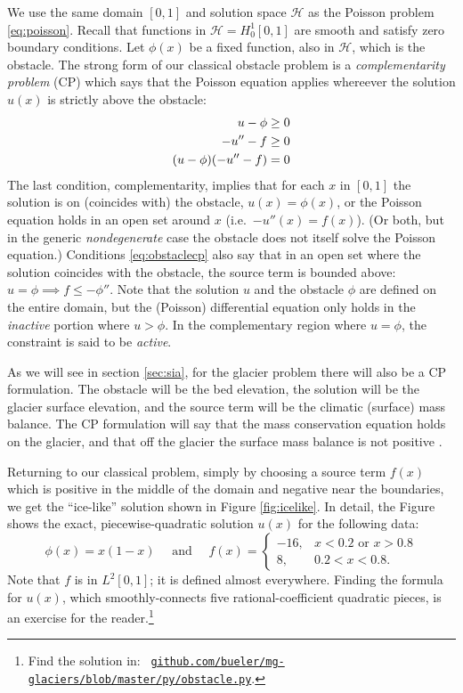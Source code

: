 \documentclass[letterpaper,final,12pt,reqno]{amsart}
\begin{document}
We use the same domain $[0,1]$ and solution space $\mathcal{H}$ as the Poisson problem \eqref{eq:poisson}.  Recall that functions in $\mathcal{H}=H_0^1[0,1]$ are smooth and satisfy zero boundary conditions.  Let $\phi(x)$ be a fixed function, also in $\mathcal{H}$, which is the obstacle.  The strong form of our classical obstacle problem is a \emph{complementarity problem} (CP) \cite{Bueler2021,KinderlehrerStampacchia1980} which says that the Poisson equation applies whereever the solution $u(x)$ is strictly above the obstacle:
\begin{align}
  u - \phi &\ge 0 \label{eq:obstaclecp} \\
  -u''-f &\ge 0 \notag \\
  (u-\phi)(-u''-f) &= 0 \notag
\end{align}
The last condition, complementarity, implies that for each $x$ in $[0,1]$ the solution is on (coincides with) the obstacle, $u(x)=\phi(x)$, or the Poisson equation holds in an open set around $x$ (i.e.~$-u''(x)=f(x)$).  (Or both, but in the generic \emph{nondegenerate} \cite{KinderlehrerStampacchia1980} case the obstacle does not itself solve the Poisson equation.)  Conditions \eqref{eq:obstaclecp} also say that in an open set where the solution coincides with the obstacle, the source term is bounded above: $u=\phi \implies f \le -\phi''$.  Note that the solution $u$ and the obstacle $\phi$ are defined on the entire domain, but the (Poisson) differential equation only holds in the \emph{inactive} portion where $u>\phi$.  In the complementary region where $u=\phi$, the constraint is said to be \emph{active}.

As we will see in section \ref{sec:sia}, for the glacier problem there will also be a CP formulation.  The obstacle will be the bed elevation, the solution will be the glacier surface elevation, and the source term will be the climatic (surface) mass balance.  The CP formulation will say that the mass conservation equation holds on the glacier, and that off the glacier the surface mass balance is not positive \cite{Bueler2016}.

Returning to our classical problem, simply by choosing a source term $f(x)$ which is positive in the middle of the domain and negative near the boundaries, we get the ``ice-like'' solution shown in Figure \ref{fig:icelike}.  In detail, the Figure shows the exact, piecewise-quadratic solution $u(x)$ for the following data:
\begin{equation}
\phi(x) = x(1-x) \quad \text{ and } \quad f(x) = \begin{cases} -16, & x<0.2 \text{ or } x>0.8 \\
                                              8, & 0.2 < x < 0.8. \end{cases}
\end{equation}
Note that $f$ is in $L^2[0,1]$; it is defined almost everywhere.  Finding the formula for $u(x)$, which smoothly-connects five rational-coefficient quadratic pieces, is an exercise for the reader.\footnote{Find the solution in: \, \href{https://github.com/bueler/mg-glaciers/blob/master/py/obstacle.py}{\texttt{github.com/bueler/mg-glaciers/blob/master/py/obstacle.py}}.}
\end{document}
